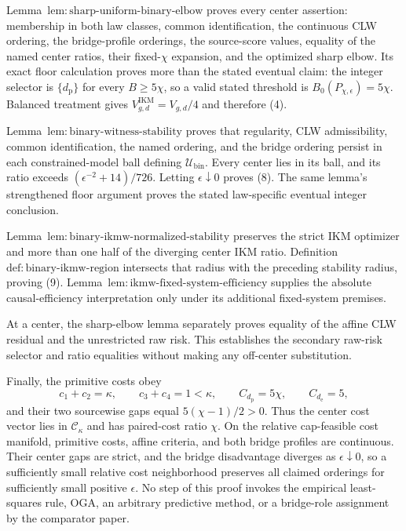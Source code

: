 Lemma~\(\mathrm{lem{:}sharp\text{-}uniform\text{-}binary\text{-}elbow}\) proves every center assertion: membership in both law classes, common identification, the continuous CLW ordering, the bridge-profile orderings, the source-score values, equality of the named center ratios, their fixed-\(\chi\) expansion, and the optimized sharp elbow.  Its exact floor calculation proves more than the stated eventual claim: the integer selector is \(\{d_{\mathrm p}\}\) for every \(B\ge5\chi\), so a valid stated threshold is \(B_0(P_{\chi,\epsilon})=5\chi\).  Balanced treatment gives \(V_{g,d}^{\mathrm{IKM}}=V_{g,d}/4\) and therefore (4).

Lemma~\(\mathrm{lem{:}binary\text{-}witness\text{-}stability}\) proves that regularity, CLW admissibility, common identification, the named ordering, and the bridge ordering persist in each constrained-model ball defining \(\mathcal U_{\mathrm{bin}}\).  Every center lies in its ball, and its ratio exceeds \((\epsilon^{-2}+14)/726\).  Letting \(\epsilon\downarrow0\) proves (8).  The same lemma's strengthened floor argument proves the stated law-specific eventual integer conclusion.

Lemma~\(\mathrm{lem{:}binary\text{-}ikmw\text{-}normalized\text{-}stability}\) preserves the strict IKM optimizer and more than one half of the diverging center IKM ratio.  Definition~\(\mathrm{def{:}binary\text{-}ikmw\text{-}region}\) intersects that radius with the preceding stability radius, proving (9).  Lemma~\(\mathrm{lem{:}ikmw\text{-}fixed\text{-}system\text{-}efficiency}\) supplies the absolute causal-efficiency interpretation only under its additional fixed-system premises.

At a center, the sharp-elbow lemma separately proves equality of the affine CLW residual and the unrestricted raw risk.  This establishes the secondary raw-risk selector and ratio equalities without making any off-center substitution.

Finally, the primitive costs obey
\[
 c_1+c_2=\kappa,
 \qquad c_3+c_4=1<\kappa,
 \qquad C_{d_{\mathrm p}}=5\chi,
 \qquad C_{d_{\mathrm e}}=5,
\]
and their two sourcewise gaps equal \(5(\chi-1)/2>0\).  Thus the center cost vector lies in \(\mathcal C_\kappa\) and has paired-cost ratio \(\chi\).  On the relative cap-feasible cost manifold, primitive costs, affine criteria, and both bridge profiles are continuous.  Their center gaps are strict, and the bridge disadvantage diverges as \(\epsilon\downarrow0\), so a sufficiently small relative cost neighborhood preserves all claimed orderings for sufficiently small positive \(\epsilon\).  No step of this proof invokes the empirical least-squares rule, OGA, an arbitrary predictive method, or a bridge-role assignment by the comparator paper.